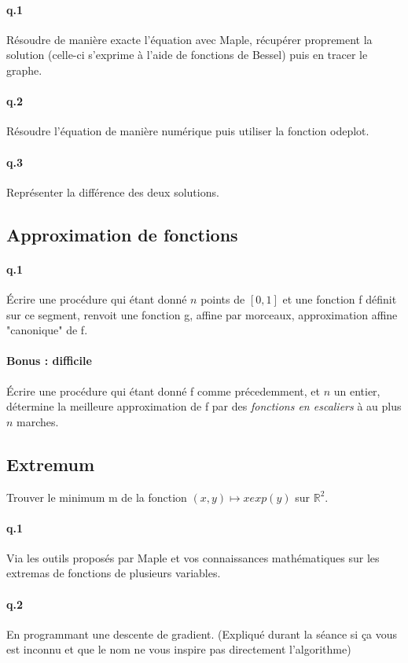\documentclass[10pt,a4paper]{article}
\begin{document}
\paragraph{q.1} Résoudre de manière exacte l’équation avec Maple,
récupérer proprement la solution (celle-ci s’exprime à l’aide de fonctions de
Bessel) puis en tracer le graphe.
\paragraph{q.2} Résoudre l’équation de manière numérique puis
utiliser la fonction odeplot.
\paragraph{q.3} Représenter la différence des deux solutions. 

\subsection{Approximation de fonctions}
\paragraph{q.1} Écrire une procédure qui étant donné $n$ points de $[0,1]$ et une fonction f définit sur ce segment, renvoit une fonction g, affine par morceaux, approximation affine "canonique" de f.
\paragraph{Bonus : difficile} Écrire une procédure qui étant donné f comme précedemment, et $n$ un entier, détermine la meilleure approximation de f par des \emph{fonctions en escaliers} à au plus $n$ marches.



\subsection{Extremum}
Trouver le minimum m de la fonction $(x,y)\mapsto xexp(y)$ sur $\mathbb{R}^2$.
\paragraph{q.1} Via les outils proposés par Maple et vos connaissances mathématiques sur les extremas de fonctions de plusieurs variables.
\paragraph{q.2} En programmant une descente de gradient. (Expliqué durant la séance si ça vous est inconnu et que le nom ne vous inspire pas directement l'algorithme)
\end{document}
